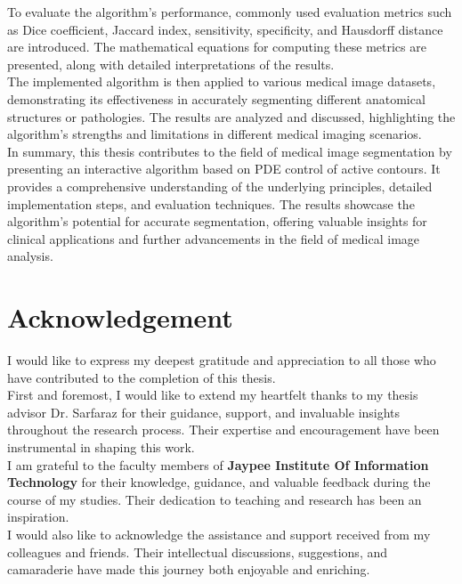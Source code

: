 \documentclass[]{report}
\begin{document}
To evaluate the algorithm's performance, commonly used evaluation metrics such as Dice coefficient, Jaccard index, sensitivity, specificity, and Hausdorff distance are introduced. The mathematical equations for computing these metrics are presented, along with detailed interpretations of the results.\\

The implemented algorithm is then applied to various medical image datasets, demonstrating its effectiveness in accurately segmenting different anatomical structures or pathologies. The results are analyzed and discussed, highlighting the algorithm's strengths and limitations in different medical imaging scenarios.\\

In summary, this thesis contributes to the field of medical image segmentation by presenting an interactive algorithm based on PDE control of active contours. It provides a comprehensive understanding of the underlying principles, detailed implementation steps, and evaluation techniques. The results showcase the algorithm's potential for accurate segmentation, offering valuable insights for clinical applications and further advancements in the field of medical image analysis.

\chapter*{Acknowledgement}
I would like to express my deepest gratitude and appreciation to all those who have contributed to the completion of this thesis.\\

First and foremost, I would like to extend my heartfelt thanks to my thesis advisor Dr. Sarfaraz for their guidance, support, and invaluable insights throughout the research process. Their expertise and encouragement have been instrumental in shaping this work.\\

I am grateful to the faculty members of \textbf{Jaypee Institute Of Information Technology} for their knowledge, guidance, and valuable feedback during the course of my studies. Their dedication to teaching and research has been an inspiration.\\

I would also like to acknowledge the assistance and support received from my colleagues and friends. Their intellectual discussions, suggestions, and camaraderie have made this journey both enjoyable and enriching.\\
\end{document}
